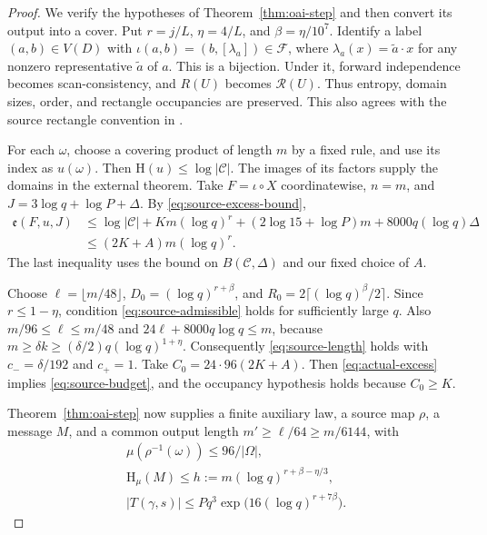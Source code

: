 \documentclass[11pt,a4paper]{article}
\numberwithin{equation}{section}
\newcommand{\HH}{\mathrm H}
\newcommand{\cC}{\mathcal C}
\newcommand{\src}[1]{\texttt{\detokenize{#1}}}
\newcommand{\oairoot}{https://github.com/openai/math/blob/adc7f1241b42e322a6451854ab7e4b4c146bf78a/lean/OAI/Combinatorics/SharpRamsey/}
\newcommand{\source}[2]{\href{\oairoot#1}{\src{#2}}}
\begin{document}
\begin{proof}
We verify the hypotheses of Theorem~\ref{thm:oai-step} and then
convert its output into a cover.
Put $r=j/L$, $\eta=4/L$, and $\beta=\eta/10^7$.
Identify a label $(a,b)\in V(D)$ with
$\iota(a,b)=(b,[\lambda_a])\in\mathcal F$, where
$\lambda_a(x)=\widetilde a\cdot x$ for any nonzero
representative $\widetilde a$ of $a$.
This is a bijection. Under it, forward independence becomes
scan-consistency, and $R(U)$ becomes $\mathcal R(U)$.
Thus entropy, domain sizes, order, and rectangle occupancies are
preserved. This also agrees with the source rectangle convention
in \source{Construction/InitialTools.lean}{rectangle_pair_iff}.

For each $\omega$, choose a covering product of length $m$
by a fixed rule, and use its index as $u(\omega)$.
Then $\HH(u)\le\log|\cC|$.
The images of its factors supply the domains in the external
theorem. Take $F=\iota\circ X$ coordinatewise,
$n=m$, and $J=3\log q+\log P+\Delta$.
By \eqref{eq:source-excess-bound},
\begin{equation}\label{eq:actual-excess}
 \begin{aligned}
 \mathfrak e(F,u,J)
 &\le\log|\cC|+Km(\log q)^r
      +(2\log15+\log P)m+8000q(\log q)\Delta\\
 &\le(2K+A)m(\log q)^r.
 \end{aligned}
\end{equation}
The last inequality uses the bound on $B(\cC,\Delta)$ and our
fixed choice of $A$.

Choose $\ell=\lfloor m/48\rfloor$,
$D_0=(\log q)^{r+\beta}$, and
$R_0=2\lceil(\log q)^\beta/2\rceil$.
Since $r\le1-\eta$, condition \eqref{eq:source-admissible}
holds for sufficiently large $q$.
Also $m/96\le\ell\le m/48$ and
$24\ell+8000q\log q\le m$, because
$m\ge\delta k\ge(\delta/2)q(\log q)^{1+\eta}$.
Consequently \eqref{eq:source-length} holds with
$c_-=\delta/192$ and $c_+=1$.
Take $C_0=24\cdot96(2K+A)$.
Then \eqref{eq:actual-excess} implies
\eqref{eq:source-budget}, and the occupancy hypothesis holds
because $C_0\ge K$.

Theorem~\ref{thm:oai-step} now supplies a finite auxiliary law,
a source map $\rho$, a message $M$, and a common output length
$m'\ge\ell/64\ge m/6144$, with
\begin{equation}\label{eq:raw}
 \begin{gathered}
 \mu(\rho^{-1}(\omega))\le96/|\Omega|,\\
 \HH_\mu(M)\le h:=m(\log q)^{r+\beta-\eta/3},\\
 |T(\gamma,s)|\le Pq^3
             \exp\bigl(16(\log q)^{r+7\beta}\bigr).
 \end{gathered}
\end{equation}


\end{proof}
\end{document}

